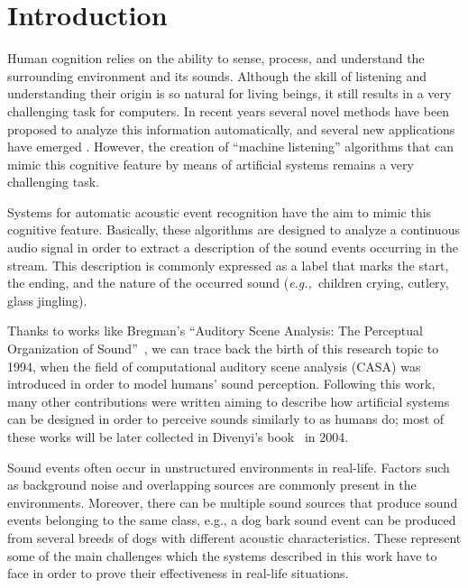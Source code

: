 \chapter{Introduction}\label{ch:intro}

Human cognition relies on the ability to sense, process, and understand the surrounding environment and its sounds.
Although the skill of listening and understanding their origin is so natural for living beings, it still results in a very challenging task for computers. In recent years several novel methods have been proposed to analyze this information automatically, and several new applications have emerged \cite{virtanen2018computational}. However, the creation of ``machine listening'' algorithms that can mimic this cognitive feature by means of artificial systems remains a very challenging task. 

Systems for automatic acoustic event recognition have the aim to mimic this cognitive feature. Basically, these algorithms are designed %
to analyze a continuous audio signal in order to extract a description of the sound events occurring in the stream. This description is commonly expressed as a label that marks the start, the ending, and the nature of the occurred sound (\emph{e.g.,}\ children crying, cutlery, glass jingling).

Thanks to works like Bregman's ``Auditory Scene Analysis: The Perceptual Organization of Sound''~\cite{bregman1994auditory}, we can trace back the birth of this research topic to 1994, when the field of computational auditory scene analysis (CASA) was introduced in order to model humans' sound perception. Following this work, many other contributions were written aiming to describe how artificial systems can be designed in order to perceive sounds similarly to as humans do; most of these works will be later collected in Divenyi's book~\cite{divenyi2004speech} in 2004. 

Sound events often occur in unstructured environments in
real-life. Factors such as background noise and overlapping
sources are commonly present in the environments. Moreover, there can be
multiple sound sources that produce sound events belonging to
the same class, e.g., a dog bark sound event can be produced from
several breeds of dogs with different acoustic characteristics. These
represent some of the main challenges which the systems described in this work have to face in order to prove their effectiveness in real-life situations.

